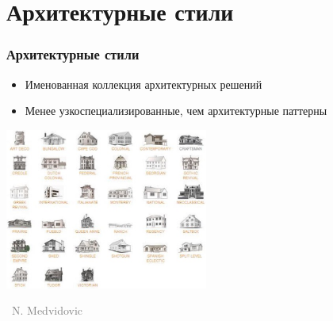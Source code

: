 \documentclass[xetex,mathserif,serif]{beamer}
\newcommand{\attribution}[1] {
    \vspace{-5mm}\begin{flushright}\begin{scriptsize}\textcolor{gray}{\textcopyright\, #1}\end{scriptsize}\end{flushright}
}
\begin{document}
    \section{Архитектурные стили}

    \begin{frame}
        \frametitle{Архитектурные стили}
        \begin{itemize}
            \item Именованная коллекция архитектурных решений
            \item Менее узкоспециализированные, чем архитектурные паттерны
        \end{itemize}
        \begin{center}
            \includegraphics[width=0.5\textwidth]{buildingStyles.png}
            \attribution{N. Medvidovic}
        \end{center}
    \end{frame}
\end{document}
